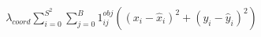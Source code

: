 \documentclass[preview]{standalone}
\begin{document}
\begin{align*}
\lambda_{coord}\sum_{i=0}^{S^{2}}\sum_{j=0}^{B}1_{ij}^{obj}\left((x_{i}-\hat{x}_{i})^{2}+(y_{i}-\hat{y}_{i})^{2}\right)
\end{align*}
\end{document}
